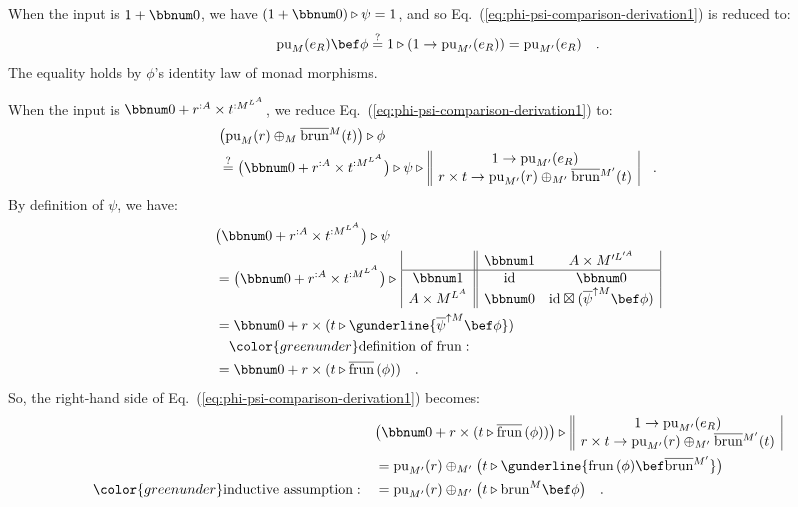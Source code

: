 When the input is $1+\bbnum 0$, we have $(1+\bbnum 0)\triangleright\psi=1$,
and so Eq.~(\ref{eq:phi-psi-comparison-derivation1}) is reduced
to:
\[
\text{pu}_{M}(e_{R})\bef\phi\overset{?}{=}1\triangleright(1\rightarrow\text{pu}_{M^{\prime}}(e_{R}))=\text{pu}_{M^{\prime}}(e_{R})\quad.
\]
The equality holds by $\phi$\textsf{'}s identity law of monad morphisms.

When the input is $\bbnum 0+r^{:A}\times t^{:M^{L^{A}}}$, we reduce
Eq.~(\ref{eq:phi-psi-comparison-derivation1}) to:
\begin{align*}
 & \big(\text{pu}_{M}(r)\oplus_{M}\overline{\text{brun}}{}^{M}(t)\big)\triangleright\phi\\
 & \overset{?}{=}\big(\bbnum 0+r^{:A}\times t^{:M^{L^{A}}}\big)\triangleright\psi\triangleright\,\begin{array}{||c|}
1\rightarrow\text{pu}_{M^{\prime}}(e_{R})\\
r\times t\rightarrow\text{pu}_{M^{\prime}}(r)\oplus_{M^{\prime}}\overline{\text{brun}}{}^{M^{\prime}}(t)
\end{array}\quad.
\end{align*}
By definition of $\psi$, we have:
\begin{align*}
 & \big(\bbnum 0+r^{:A}\times t^{:M^{L^{A}}}\big)\triangleright\psi\\
 & =\big(\bbnum 0+r^{:A}\times t^{:M^{L^{A}}}\big)\triangleright\,\begin{array}{|c||cc|}
 & \bbnum 1 & A\times M^{\prime L^{\prime A}}\\
\hline \bbnum 1 & \text{id} & \bbnum 0\\
A\times M^{L^{A}} & \bbnum 0 & \text{id}\boxtimes(\overline{\psi}^{\uparrow M}\bef\phi)
\end{array}\\
 & =\bbnum 0+r\times(t\triangleright\gunderline{\overline{\psi}^{\uparrow M}\bef\phi})\\
 & \quad{\color{greenunder}\text{definition of }\text{frun}:}\quad\\
 & =\bbnum 0+r\times(t\triangleright\overline{\text{frun}}\,(\phi))\quad.
\end{align*}
So, the right-hand side of Eq.~(\ref{eq:phi-psi-comparison-derivation1})
becomes:
\begin{align*}
 & \big(\bbnum 0+r\times(t\triangleright\overline{\text{frun}}\,(\phi))\big)\triangleright\,\begin{array}{||c|}
1\rightarrow\text{pu}_{M^{\prime}}(e_{R})\\
r\times t\rightarrow\text{pu}_{M^{\prime}}(r)\oplus_{M^{\prime}}\overline{\text{brun}}{}^{M^{\prime}}(t)
\end{array}\\
 & =\text{pu}_{M^{\prime}}(r)\oplus_{M^{\prime}}\big(t\triangleright\gunderline{\text{frun}\,(\phi)\bef\overline{\text{brun}}{}^{M^{\prime}}}\big)\\
{\color{greenunder}\text{inductive assumption}:}\quad & =\text{pu}_{M^{\prime}}(r)\oplus_{M^{\prime}}\big(t\triangleright\text{brun}^{M}\bef\phi\big)\quad.
\end{align*}
